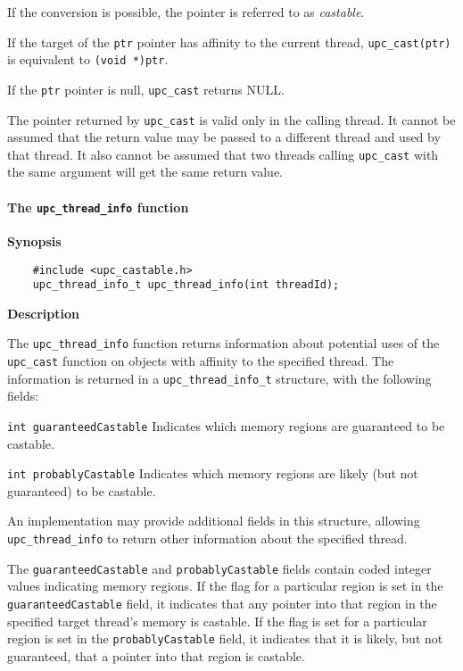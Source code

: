 \np If the conversion is possible, the pointer is referred to as {\em castable}.

\np If the target of the {\tt ptr} pointer has affinity to the current
thread, {\tt upc\_cast(ptr)} is equivalent to {\tt (void *)ptr}.

\np If the {\tt ptr} pointer is null, {\tt upc\_cast} returns NULL.

\np The pointer returned by {\tt upc\_cast} is valid only in the calling
thread.  It cannot be assumed that the return value may be passed to
a different thread and used by that thread.  It also cannot be assumed that two
threads calling {\tt upc\_cast} with the same argument will get the same
return value.

\paragraph{The {\tt upc\_thread\_info} function}

{\bf Synopsis}

\npf\vspace{-2.5em}
\begin{verbatim}
    #include <upc_castable.h>
    upc_thread_info_t upc_thread_info(int threadId);
\end{verbatim}

{\bf Description}

\np The {\tt upc\_thread\_info} function returns information about
potential uses of the {\tt upc\_cast} function on objects with
affinity to the specified thread.  The information is returned in a
{\tt upc\_thread\_info\_t} structure, with the following fields:

\begin{description}
\item{\tt int guaranteedCastable}
Indicates which memory regions are guaranteed to be castable.
\item{\tt int probablyCastable}
Indicates which memory regions are likely (but not guaranteed)
to be castable.
\end{description}

\np An implementation may provide additional fields in this structure,
allowing {\tt upc\_thread\_info} to return other information about
the specified thread.

\np The {\tt guaranteedCastable} and {\tt probablyCastable} fields
contain coded integer values indicating memory regions.  If the flag
for a particular region is set in the {\tt guaranteedCastable} field,
it indicates that
any pointer into that region in the specified target thread's memory is
castable.  If the flag is
set for a particular region is set in the {\tt probablyCastable} field,
it indicates that it is likely, but not guaranteed, that a pointer into
that region is castable.

